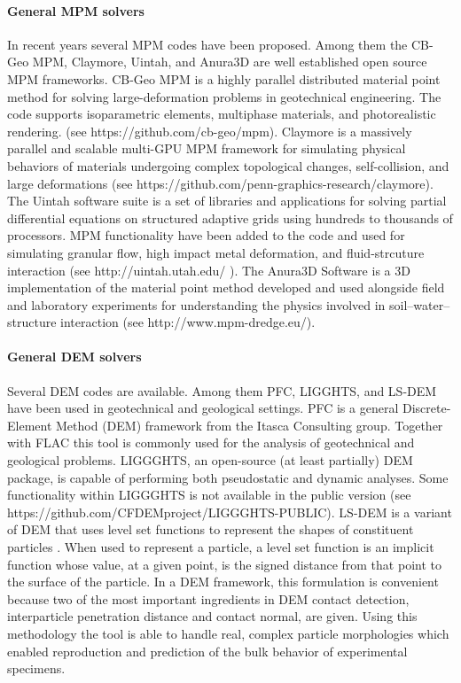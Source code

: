 \paragraph{General MPM solvers}
In recent years several MPM codes have been proposed. Among them the CB-Geo MPM, Claymore, Uintah, and Anura3D are well established open source MPM frameworks. CB-Geo MPM is a highly parallel distributed material point method for solving large-deformation problems in geotechnical engineering. The code supports isoparametric elements, multiphase materials, and photorealistic rendering.
(see https://github.com/cb-geo/mpm). Claymore is a massively parallel and scalable multi-GPU MPM framework for simulating physical behaviors of materials undergoing complex topological changes, self-collision, and large deformations (see https://github.com/penn-graphics-research/claymore). The Uintah software suite is a set of libraries and applications for solving partial differential equations on structured adaptive grids using hundreds to thousands of processors. MPM functionality have been added to the code and used for simulating granular flow, high impact metal deformation, and fluid-strcuture interaction (see http://uintah.utah.edu/ ). The Anura3D Software is a 3D implementation of the material point method developed and used alongside field and laboratory experiments for understanding the physics involved in soil–water–structure interaction (see http://www.mpm-dredge.eu/).\\

\paragraph{General DEM solvers}
Several DEM codes are available. Among them PFC, LIGGHTS, and LS-DEM have been used in geotechnical and geological settings.
PFC is a general Discrete-Element Method (DEM) framework from the Itasca Consulting group. Together with FLAC this tool is commonly used for the analysis of geotechnical and geological problems.
LIGGGHTS, an open-source (at least partially) DEM package, is capable of performing both pseudostatic and dynamic analyses. Some functionality within LIGGGHTS is not available in the public version (see https://github.com/CFDEMproject/LIGGGHTS-PUBLIC). LS-DEM is a variant of DEM that uses level set functions to represent the shapes of constituent particles \citep{kawamoto2018}. When used to represent a particle, a level set function is an implicit function whose value, at a given point, is the signed distance from that point to the surface of the particle. In a DEM framework, this formulation is convenient because two of the most important ingredients in DEM contact detection, interparticle penetration distance and contact normal, are given. Using this methodology the tool is able to handle real, complex particle morphologies which enabled reproduction and prediction of the bulk behavior of experimental specimens.
